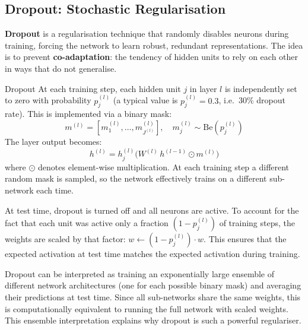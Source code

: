 \documentclass[11pt,a4paper]{article}
\newcommand{\term}[1]{\textcolor{DefGreen}{\textbf{#1}}}
\begin{document}
\subsection{Dropout: Stochastic Regularisation}

\term{Dropout} is a regularisation technique that randomly disables neurons during training, forcing the network to learn robust, redundant representations. The idea is to prevent \term{co-adaptation}: the tendency of hidden units to rely on each other in ways that do not generalise.

\begin{defbox}{Dropout}
At each training step, each hidden unit $j$ in layer $l$ is independently set to zero with probability $p_j^{(l)}$ (a typical value is $p_j^{(l)} = 0.3$, i.e.\ 30\% dropout rate). This is implemented via a binary mask:
\[
m^{(l)} = [m_1^{(l)}, \ldots, m_{J^{(l)}}^{(l)}], \quad m_j^{(l)} \sim \mathrm{Be}(p_j^{(l)})
\]
The layer output becomes:
\[
h^{(l)} = h_j^{(l)}\bigl(W^{(l)}\, h^{(l-1)} \odot m^{(l)}\bigr)
\]
where $\odot$ denotes element-wise multiplication. At each training step a different random mask is sampled, so the network effectively trains on a different sub-network each time.
\end{defbox}

At test time, dropout is turned off and all neurons are active. To account for the fact that each unit was active only a fraction $(1-p_j^{(l)})$ of training steps, the weights are scaled by that factor: $w \leftarrow (1 - p_j^{(l)}) \cdot w$. This ensures that the expected activation at test time matches the expected activation during training.

\begin{insightbox}
Dropout can be interpreted as training an exponentially large ensemble of different network architectures (one for each possible binary mask) and averaging their predictions at test time. Since all sub-networks share the same weights, this is computationally equivalent to running the full network with scaled weights. This ensemble interpretation explains why dropout is such a powerful regulariser.
\end{insightbox}
\end{document}
